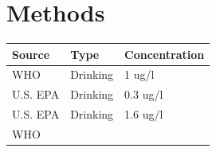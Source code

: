 \documentclass[11pt,]{article}
\begin{document}
\section{Methods}\label{methods}

\begin{longtable}[c]{@{}lll@{}}
\toprule
\begin{minipage}[b]{0.11\columnwidth}\raggedright\strut
Source
\strut\end{minipage} &
\begin{minipage}[b]{0.16\columnwidth}\raggedright\strut
Type
\strut\end{minipage} &
\begin{minipage}[b]{0.19\columnwidth}\raggedright\strut
Concentration
\strut\end{minipage}\tabularnewline
\midrule
\endhead
\begin{minipage}[t]{0.11\columnwidth}\raggedright\strut
WHO
\strut\end{minipage} &
\begin{minipage}[t]{0.16\columnwidth}\raggedright\strut
Drinking
\strut\end{minipage} &
\begin{minipage}[t]{0.19\columnwidth}\raggedright\strut
1 ug/l
\strut\end{minipage}\tabularnewline
\begin{minipage}[t]{0.11\columnwidth}\raggedright\strut
U.S. EPA
\strut\end{minipage} &
\begin{minipage}[t]{0.16\columnwidth}\raggedright\strut
Drinking
\strut\end{minipage} &
\begin{minipage}[t]{0.19\columnwidth}\raggedright\strut
0.3 ug/l
\strut\end{minipage}\tabularnewline
\begin{minipage}[t]{0.11\columnwidth}\raggedright\strut
U.S. EPA
\strut\end{minipage} &
\begin{minipage}[t]{0.16\columnwidth}\raggedright\strut
Drinking
\strut\end{minipage} &
\begin{minipage}[t]{0.19\columnwidth}\raggedright\strut
1.6 ug/l
\strut\end{minipage}\tabularnewline
\begin{minipage}[t]{0.11\columnwidth}\raggedright\strut
WHO
\strut\end{minipage} &
\begin{minipage}[t]{0.16\columnwidth}\raggedright\strut

\end{minipage}
\end{longtable}
\end{document}
